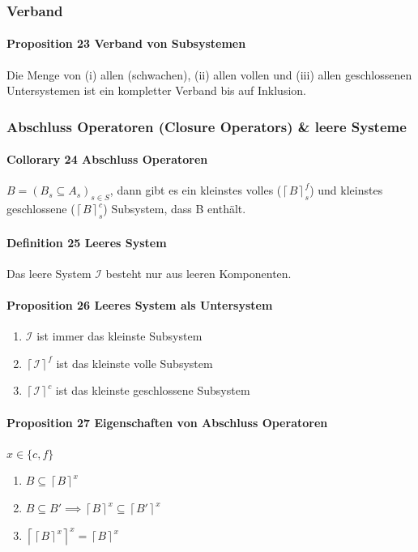 \subsubsection{Verband}

\paragraph{Proposition 23 Verband von Subsystemen}
Die Menge von (i) allen (schwachen), (ii) allen vollen und (iii) allen geschlossenen Untersystemen ist ein kompletter Verband bis auf Inklusion.

\subsubsection{Abschluss Operatoren (Closure Operators) \& leere Systeme}

\paragraph{Collorary 24 Abschluss Operatoren}
$B = (B_s \subseteq A_s)_{s \in S}$, dann gibt es ein kleinstes volles ($\left\lceil B\right\rceil _{s}^{f}$) und kleinstes geschlossene ($\left\lceil B\right\rceil _{s}^{c}$) Subsystem, dass B enthält.

\paragraph{Definition 25 Leeres System}
Das leere System $\mathcal{I}$ besteht nur aus leeren Komponenten.

\paragraph{Proposition 26 Leeres System als Untersystem}
\begin{enumerate}
\item $\mathcal{I}$ ist immer das kleinste Subsystem
\item $\left\lceil \mathcal{I}\right\rceil ^{f}$ ist das kleinste volle Subsystem
\item $\left\lceil \mathcal{I}\right\rceil ^{c}$ ist das kleinste geschlossene Subsystem
\end{enumerate}

\paragraph{Proposition 27 Eigenschaften von Abschluss Operatoren}
$x \in \{c,f\}$
\begin{enumerate}
\item $B\subseteq\left\lceil B\right\rceil ^{x}$
\item $B\subseteq B'\implies\left\lceil B\right\rceil ^{x}\subseteq\left\lceil B'\right\rceil ^{x}$
\item $\left\lceil \left\lceil B\right\rceil ^{x}\right\rceil ^{x}=\left\lceil B\right\rceil ^{x}$
\end{enumerate}

